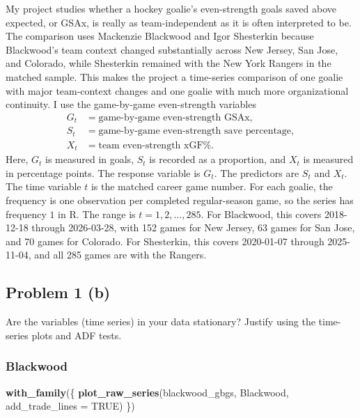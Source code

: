 \documentclass[
  10pt,
]{extarticle}
\newenvironment{Shaded}{\begin{snugshade}}{\end{snugshade}}
\newcommand{\AttributeTok}[1]{\textcolor[rgb]{0.13,0.29,0.53}{#1}}
\newcommand{\ConstantTok}[1]{\textcolor[rgb]{0.56,0.35,0.01}{#1}}
\newcommand{\FunctionTok}[1]{\textcolor[rgb]{0.13,0.29,0.53}{\textbf{#1}}}
\newcommand{\NormalTok}[1]{#1}
\newcommand{\StringTok}[1]{\textcolor[rgb]{0.31,0.60,0.02}{#1}}
\begin{document}
My project studies whether a hockey goalie's even-strength goals saved above expected, or GSAx, is really as team-independent as it is often interpreted to be. The comparison uses Mackenzie Blackwood and Igor Shesterkin because Blackwood's team context changed substantially across New Jersey, San Jose, and Colorado, while Shesterkin remained with the New York Rangers in the matched sample. This makes the project a time-series comparison of one goalie with major team-context changes and one goalie with much more organizational continuity. I use the game-by-game even-strength variables
\[
\begin{aligned}
G_t &= \text{game-by-game even-strength GSAx},\\
S_t &= \text{game-by-game even-strength save percentage},\\
X_t &= \text{team even-strength xGF\%}.
\end{aligned}
\]
Here, \(G_t\) is measured in goals, \(S_t\) is recorded as a proportion, and \(X_t\) is measured in percentage points. The response variable is \(G_t\). The predictors are \(S_t\) and \(X_t\). The time variable \(t\) is the matched career game number. For each goalie, the frequency is one observation per completed regular-season game, so the series has frequency \(1\) in \textsf{R}. The range is \(t = 1,2,\ldots,285\). For Blackwood, this covers 2018-12-18 through 2026-03-28, with 152 games for New Jersey, 63 games for San Jose, and 70 games for Colorado. For Shesterkin, this covers 2020-01-07 through 2025-11-04, and all 285 games are with the Rangers.

\newpage

\subsection{Problem 1 (b)}\label{problem-1-b}

\begin{problem}[Problem 1 (b)]
Are the variables (time series) in your data stationary? Justify using the time-series plots and ADF tests.
\end{problem}

\subsubsection{Blackwood}\label{blackwood}

\begin{Shaded}
\begin{Highlighting}[]
\FunctionTok{with\_family}\NormalTok{(\{}
  \FunctionTok{plot\_raw\_series}\NormalTok{(blackwood\_gbgs, }\StringTok{\textquotesingle{}Blackwood\textquotesingle{}}\NormalTok{, }\AttributeTok{add\_trade\_lines =} \ConstantTok{TRUE}\NormalTok{)}
\NormalTok{\})}
\end{Highlighting}
\end{Shaded}
\end{document}
